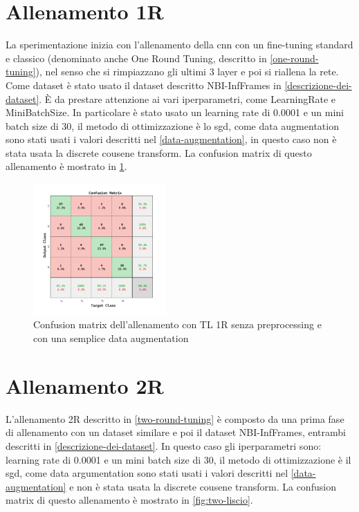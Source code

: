 \section{Allenamento 1R}\label{allenamento-1r}

La sperimentazione inizia con l'allenamento della \gls{cnn} con un fine-tuning standard e classico (denominato anche One Round Tuning, descritto in \cref{one-round-tuning}), nel senso che si rimpiazzano gli ultimi 3 layer e poi si riallena la rete. Come dataset è stato usato il dataset descritto NBI-InfFrames in \cref{descrizione-dei-dataset}. È da prestare attenzione ai vari iperparametri, come \Gls{LearningRate} e \Gls{MiniBatchSize}. In particolare è stato usato un learning rate di 0.0001 e un mini batch size di 30, il metodo di ottimizzazione è lo \gls{sgd}, come data augmentation sono stati usati i valori descritti nel \cref{data-augmentation}, in questo caso non è stata usata la discrete cousene transform. La confusion matrix di questo allenamento è mostrato in \cref{fig:one-liscio}.


\begin{figure}[ht]
    \centering
    \includegraphics[width=0.45\textwidth]{addestramento-rete-neurale/one-liscio.pdf}
    \caption{Confusion matrix dell'allenamento con TL 1R senza preprocessing e con una semplice data augmentation}
    \label{fig:one-liscio}
\end{figure}

\section{Allenamento 2R}\label{allenamento-2r}

L'allenamento 2R descritto in \cref{two-round-tuning} è composto da una prima fase di allenamento con un dataset similare e poi il dataset NBI-InfFrames, entrambi descritti in  \cref{descrizione-dei-dataset}. In questo caso gli iperparametri sono:   learning rate di 0.0001 e un mini batch size di 30, il metodo di ottimizzazione è il \gls{sgd}, come data argumentation sono stati usati i valori descritti nel \cref{data-augmentation} e non è stata usata la discrete cousene transform. La confusion matrix di questo allenamento è mostrato in \cref{fig:two-liscio}.


